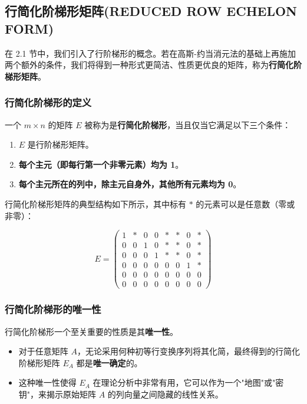 \subsection{行简化阶梯形矩阵(REDUCED ROW ECHELON FORM)}

在 2.1 节中，我们引入了行阶梯形的概念。若在高斯-约当消元法的基础上再施加两个额外的条件，我们将得到一种形式更简洁、性质更优良的矩阵，称为\textbf{行简化阶梯形矩阵}。

\subsubsection{行简化阶梯形的定义}

一个 \( m \times n \) 的矩阵 \( E \) 被称为是\textbf{行简化阶梯形}，当且仅当它满足以下三个条件：
\begin{enumerate}
    \item \( E \) 是行阶梯形矩阵。
    \item \textbf{每个主元（即每行第一个非零元素）均为 1}。
    \item \textbf{每个主元所在的列中，除主元自身外，其他所有元素均为 0}。
\end{enumerate}

行简化阶梯形矩阵的典型结构如下所示，其中标有 \(*\) 的元素可以是任意数（零或非零）：

\[
E = \begin{pmatrix}
1 & * & 0 & 0 & * & * & 0 & * \\
0 & 0 & 1 & 0 & * & * & 0 & * \\
0 & 0 & 0 & 1 & * & * & 0 & * \\
0 & 0 & 0 & 0 & 0 & 0 & 1 & * \\
0 & 0 & 0 & 0 & 0 & 0 & 0 & 0 \\
0 & 0 & 0 & 0 & 0 & 0 & 0 & 0
\end{pmatrix}
\]

\subsubsection{行简化阶梯形的唯一性}

行简化阶梯形一个至关重要的性质是其\textbf{唯一性}。
\begin{itemize}
    \item 对于任意矩阵 \( A \)，无论采用何种初等行变换序列将其化简，最终得到的行简化阶梯形矩阵 \( E_A \) 都是\textbf{唯一确定}的。
    \item 这种唯一性使得 \( E_A \) 在理论分析中非常有用，它可以作为一个"地图"或"密钥"，来揭示原始矩阵 \( A \) 的列向量之间隐藏的线性关系。
\end{itemize}

